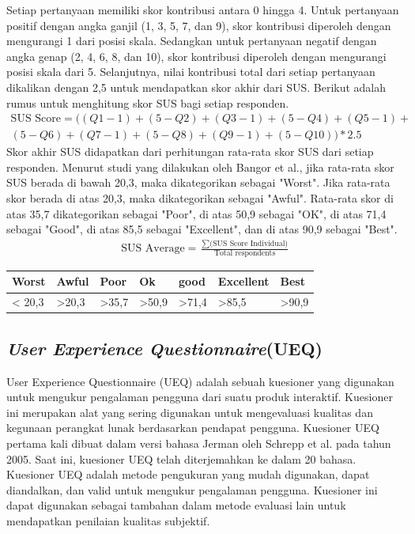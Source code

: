 Setiap pertanyaan memiliki skor kontribusi antara 0 hingga 4. 
Untuk pertanyaan positif dengan angka ganjil (1, 3, 5, 7, dan 9), skor kontribusi diperoleh dengan mengurangi 1 dari posisi skala.
Sedangkan untuk pertanyaan negatif dengan angka genap (2, 4, 6, 8, dan 10), skor kontribusi diperoleh dengan mengurangi posisi skala dari 5.
Selanjutnya, nilai kontribusi total dari setiap pertanyaan dikalikan dengan 2,5 untuk mendapatkan skor akhir dari SUS. Berikut adalah rumus untuk menghitung skor SUS bagi setiap responden.
\begin{equation}
\begin{split}
	\text{SUS Score} = ((Q1-1)+(5-Q2)+(Q3-1)+(5-Q4)+(Q5-1)+ \\ 
	(5-Q6)+(Q7-1)+(5-Q8)+(Q9-1)+(5-Q10))*2.5
\end{split}
\end{equation}
Skor akhir SUS didapatkan dari perhitungan rata-rata skor SUS dari setiap responden.
Menurut studi yang dilakukan oleh Bangor et al., 
jika rata-rata skor SUS berada di bawah 20,3, maka dikategorikan sebagai "Worst".
Jika rata-rata skor berada di atas 20,3, maka dikategorikan sebagai "Awful". 
Rata-rata skor di atas 35,7 dikategorikan sebagai "Poor", di atas 50,9 sebagai "OK", di atas 71,4 sebagai "Good", di atas 85,5 sebagai "Excellent", dan di atas 90,9 sebagai "Best".
\begin{equation}
	\begin{split}
		\text{SUS Average} = \frac{\sum \text{(SUS Score Individual)}}{\text{Total respondents}} 
	\end{split}
	\label{Perhitungan rata-rata skor SUS}
\end{equation}
\begin{table}[htbp]
	\centering
	\begin{tabular}{|m{}|m{}|m{}|m{}|m{}|m{}|m{}|}
		\hline
		Worst & Awful & Poor & Ok & good & Excellent & Best \\
		\hline
		< 20,3 & >20,3 & >35,7& >50,9 & >71,4& >85,5 & >90,9 \\
		\hline
	\end{tabular}
\end{table}

\subsection{\textit{User Experience Questionnaire}(UEQ)}
User Experience Questionnaire (UEQ) adalah sebuah kuesioner yang digunakan untuk mengukur pengalaman pengguna dari suatu produk interaktif.
Kuesioner ini merupakan alat yang sering digunakan untuk mengevaluasi kualitas dan kegunaan perangkat lunak berdasarkan pendapat pengguna. 
Kuesioner UEQ pertama kali dibuat dalam versi bahasa Jerman oleh Schrepp et al. pada tahun 2005.
Saat ini, kuesioner UEQ telah diterjemahkan ke dalam 20 bahasa. Kuesioner UEQ adalah metode pengukuran yang mudah digunakan, dapat diandalkan, dan valid untuk mengukur pengalaman pengguna.
Kuesioner ini dapat digunakan sebagai tambahan dalam metode evaluasi lain untuk mendapatkan penilaian kualitas subjektif.

